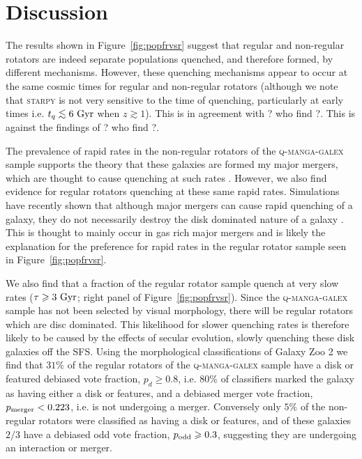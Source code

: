 \documentclass[useAMS,usenatbib]{mn2e}
\def\lesssim{\mathrel{\hbox{\rlap{\hbox{\lower3pt\hbox{$\sim$}}}\hbox{\raise2pt\hbox{$<$}}}}}
\begin{document}
\section{Discussion}\label{sec:discussion}

The results shown in Figure~\ref{fig:popfrvsr} suggest that regular and non-regular rotators are indeed separate populations quenched, and therefore formed, by different mechanisms. However, these quenching mechanisms appear to occur at the same cosmic times for regular and non-regular rotators (although we note that \textsc{starpy} is not very sensitive to the time of quenching, particularly at early times i.e. $t_q \lesssim 6~\rm{Gyr}$ when $z \gtrsim 1$). This is in agreement with ? who find ?. This is against the findings of ? who find ?. 

The prevalence of rapid rates in the non-regular rotators of the \textsc{q-manga-galex} sample supports the theory that these galaxies are formed my major mergers, which are thought to cause quenching at such rates \cite{?,?,smethurst15}. However, we also find evidence for regular rotators quenching at these same rapid rates. Simulations have recently shown that although major mergers can cause rapid quenching of a galaxy, they do not necessarily destroy the disk dominated nature of a galaxy \citep{pontzen16, sparre16}. This is thought to mainly occur in gas rich major mergers and is likely the explanation for the preference for rapid rates in the regular rotator sample seen in Figure~\ref{fig:popfrvsr}.

We also find that a fraction of the regular rotator sample quench at very slow rates ($\tau \geq 3~\rm{Gyr}$; right panel of Figure~\ref{fig:popfrvsr}). Since the \textsc{q-manga-galex} sample has not been selected by visual morphology, there will be regular rotators which are disc dominated. This likelihood for slower quenching rates is therefore likely to be caused by the effects of secular evolution, slowly quenching these disk galaxies off the SFS. Using the morphological classifications of Galaxy Zoo 2 \citep{lintott11, GZ2} we find that $31\%$ of the regular rotators of the \textsc{q-manga-galex} sample have a disk or featured debiased vote fraction, $p_d \geq 0.8$, i.e. $80\%$ of classifiers marked the galaxy as having either a disk or features, and a debiased merger vote fraction, $p_{\rm{merger}} < 0.223$, i.e. is not undergoing a merger. Conversely only $5\%$ of the non-regular rotators were classified as having a disk or features, and of these galaxies $2/3$ have a debiased odd vote fraction, $p_{\rm{odd}} \geq 0.3$, suggesting they are undergoing an interaction or merger.  
\end{document}
